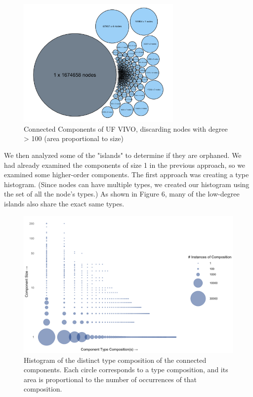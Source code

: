 \documentclass[11pt]{article}
\begin{document}
\begin{figure}[h!]
\centering
\includegraphics[width=8cm]{cc-3.png}
\caption{Connected Components of UF VIVO, discarding nodes with degree > 100 (area proportional to size)}
\label{fig:output}
\end{figure}

We then analyzed some of the "islands" to determine if they are orphaned. We had already examined the components of size 1 in the previous approach, so we examined some higher-order components. The first approach was creating a type histogram. (Since nodes can have multiple types, we created our histogram using the set of all the node's types.) As shown in Figure 6, many of the low-degree islands also share the exact same types.

\begin{figure}[h!]
\centering
\includegraphics[width=\textwidth]{type-histogram.png}
\caption{Histogram of the distinct type composition of the connected components. Each circle corresponds to a type composition, and its area is proportional to the number of occurrences of that composition.}
\label{fig:output}
\end{figure}
\end{document}
